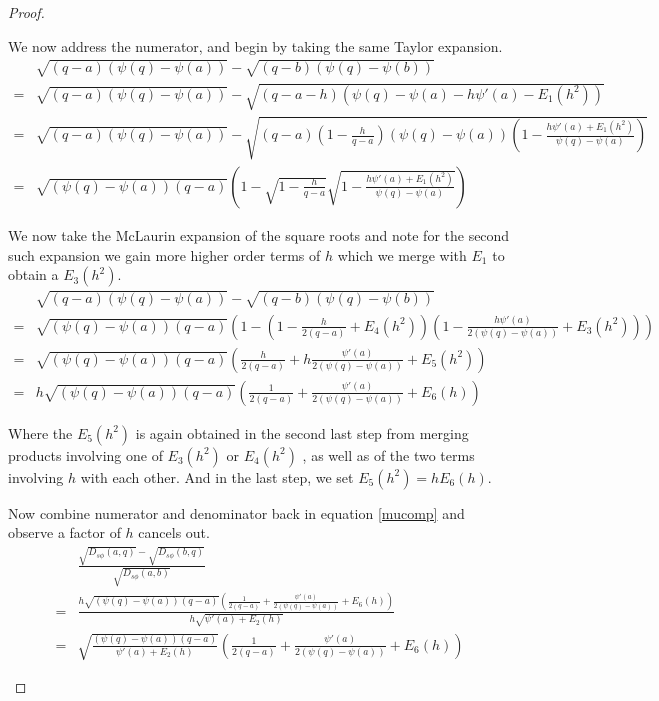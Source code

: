 \documentclass[11pt]{myclass}
\newcommand{\sbreg}{\ensuremath{D_{s\phi}}}
\begin{document}
\begin{proof}
\begin{description}
We now address the numerator, and begin by taking the same Taylor expansion.
\begin{align*}
&\sqrt{(q-a)(\psi(q) - \psi(a))} - \sqrt{(q-b) (\psi(q) - \psi(b)) } 
\\ =&  \sqrt{(q-a) (\psi(q) - \psi(a))}  - \sqrt{(q-a-h) (\psi(q) - \psi(a) - h \psi'(a)-E_1(h^2)) } 
\\ =&  \sqrt{(q-a) (\psi(q) - \psi(a))}  - \sqrt{(q-a)\left( 1-\frac{h}{q-a} \right) (\psi(q) - \psi(a)) \left( 1 -  \frac{h \psi'(a) + E_1(h^2)}{\psi(q) - \psi(a)} \right)}
\\ =& \sqrt{(\psi(q) - \psi(a))(q-a)} \left(1 - \sqrt{ 1 - \frac{h}{q-a}} \sqrt{ 1 - \frac{h \psi'(a) + E_1(h^2)}{\psi(q) - \psi(a)} } \right) 
\end{align*}

We now take the McLaurin expansion of the square roots and note for the second such expansion we gain more higher order terms of $h$ which we merge with
$E_1$ to obtain a $E_3(h^2)$. 
\begin{align*}
&\sqrt{(q-a)(\psi(q) - \psi(a))} - \sqrt{(q-b) (\psi(q) - \psi(b)) } 
\\ =&  \sqrt{(\psi(q) - \psi(a))(q-a)} \left(1 - \left( 1- \frac{h}{2(q-a)} +E_4(h^2)\right) \left(1 -  \frac{h \psi'(a)}{2(\psi(q) - \psi(a))} + E_3(h^2) \right) \right) 
\\ =& \sqrt{(\psi(q) - \psi(a))(q-a)} \left( \frac{h}{2(q-a)} + h \frac{\psi'(a)}{2(\psi(q) - \psi(a))}+E_5(h^2) \right) 
\\ =& h\sqrt{(\psi(q) - \psi(a))(q-a)} \left( \frac{1}{2(q-a)} +  \frac{\psi'(a)}{2(\psi(q) - \psi(a))}+E_6(h) \right) 
\end{align*}

Where the $E_5(h^2)$ is again obtained in the second last step from merging products involving one of $E_3(h^2)$ or $E_4(h^2)$ , as well as of the two terms involving $h$ with each other. And in the last step, we set $E_5(h^2) = h E_6(h)$.

Now combine numerator and denominator back in equation \ref{mucomp} and observe a factor of $h$ cancels out. 
\begin{align*}
&\frac{\sqrt{\sbreg(a,q)} - \sqrt{\sbreg(b,q)}}{\sqrt{\sbreg(a,b)}} \\
=& \frac{ h \sqrt{(\psi(q) - \psi(a))(q-a)} 
                         \left( \frac{1}{2 (q-a)} + \frac{\psi'(a)}{2 (\psi(q) - \psi(a))} + E_6(h) \right)}
        { h \sqrt{\psi'(a) + E_2(h)}} 
\\ = &\sqrt{\frac{(\psi(q) - \psi(a))(q-a)}{\psi'(a)  + E_2(h)}} 
      \left( \frac{1}{2 (q-a)} + \frac{\psi'(a)}{2 (\psi(q) - \psi(a))} + E_6(h) \right) 
\end{align*}


\end{description}
\end{proof}
\end{document}
